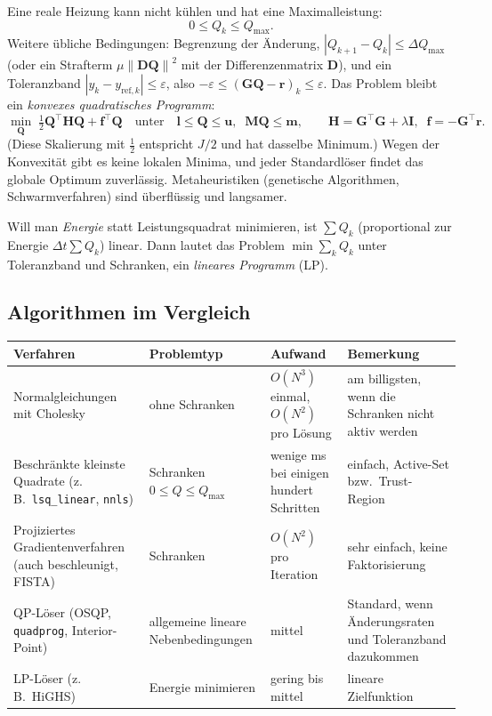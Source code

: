 \documentclass[11pt,a4paper]{article}
\numberwithin{equation}{section}
\newcommand{\dt}{\Delta t}
\newcommand{\mI}{\mathbf{I}}
\newcommand{\mG}{\mathbf{G}}
\newcommand{\vQ}{\mathbf{Q}}
\newcommand{\vr}{\mathbf{r}}
\newcommand{\norm}[1]{\left\lVert #1\right\rVert}
\begin{document}
Eine reale Heizung kann nicht kühlen und hat eine Maximalleistung:
\begin{equation}
 0\le Q_k\le Q_{\max}.
\end{equation}
Weitere übliche Bedingungen: Begrenzung der Änderung, $|Q_{k+1}-Q_k|\le\Delta Q_{\max}$ (oder ein Strafterm $\mu\norm{\mathbf D\vQ}^2$ mit der Differenzenmatrix $\mathbf D$), und ein Toleranzband $|y_k-y_{\mathrm{ref},k}|\le\varepsilon$, also $-\varepsilon\le(\mG\vQ-\vr)_k\le\varepsilon$. Das Problem bleibt ein \emph{konvexes quadratisches Programm}:
\begin{equation}
 \min_{\vQ}\;\tfrac12\vQ^\top\mathbf H\vQ+\mathbf f^\top\vQ\quad\text{unter}\quad\mathbf l\le\vQ\le\mathbf u,\;\;\mathbf M\vQ\le\mathbf m,
 \qquad\mathbf H=\mG^\top\mG+\lambda\mI,\;\;\mathbf f=-\mG^\top\vr .
\end{equation}
(Diese Skalierung mit $\tfrac12$ entspricht $J/2$ und hat dasselbe Minimum.) Wegen der Konvexität gibt es keine lokalen Minima, und jeder Standardlöser findet das globale Optimum zuverlässig. Metaheuristiken (genetische Algorithmen, Schwarmverfahren) sind überflüssig und langsamer.

Will man \emph{Energie} statt Leistungsquadrat minimieren, ist $\sum Q_k$ (proportional zur Energie $\dt\sum Q_k$) linear. Dann lautet das Problem $\min\sum_kQ_k$ unter Toleranzband und Schranken, ein \emph{lineares Programm} (LP).

\subsection{Algorithmen im Vergleich}

\begin{center}
\small
\begin{tabular}{>{\RaggedRight}p{3.6cm}>{\RaggedRight}p{3.1cm}>{\RaggedRight}p{3.5cm}>{\RaggedRight}p{4.0cm}}
\toprule
Verfahren & Problemtyp & Aufwand & Bemerkung \\
\midrule
Normalgleichungen mit Cholesky & ohne Schranken & $O(N^3)$ einmal, $O(N^2)$ pro Lösung & am billigsten, wenn die Schranken nicht aktiv werden \\
Beschränkte kleinste Quadrate (z.\,B.\ \texttt{lsq\_linear}, \texttt{nnls}) & Schranken $0\le Q\le Q_{\max}$ & wenige ms bei einigen hundert Schritten & einfach, Active-Set bzw.\ Trust-Region \\
Projiziertes Gradientenverfahren (auch beschleunigt, FISTA) & Schranken & $O(N^2)$ pro Iteration & sehr einfach, keine Faktorisierung \\
QP-Löser (OSQP, \texttt{quadprog}, Interior-Point) & allgemeine lineare Nebenbedingungen & mittel & Standard, wenn Änderungsraten und Toleranzband dazukommen \\
LP-Löser (z.\,B.\ HiGHS) & Energie minimieren & gering bis mittel & lineare Zielfunktion \\
\bottomrule
\end{tabular}
\end{center}
\end{document}
